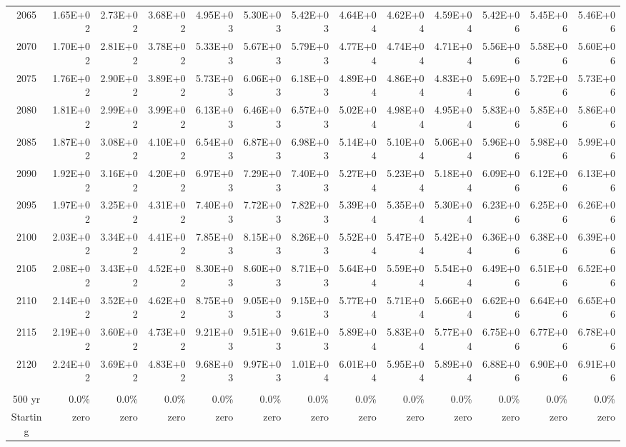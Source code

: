 \documentclass{article}
\begin{document}
\begin{table}
\begin{tabular}{crrr|rrr|rrr|rrr}
2065     & 1.65E+02 & 2.73E+02 & 3.68E+02 & 4.95E+03 & 5.30E+03 & 5.42E+03 & 4.64E+04 & 4.62E+04 & 4.59E+04 & 5.42E+06 & 5.45E+06 & 5.46E+06 \\
2070     & 1.70E+02 & 2.81E+02 & 3.78E+02 & 5.33E+03 & 5.67E+03 & 5.79E+03 & 4.77E+04 & 4.74E+04 & 4.71E+04 & 5.56E+06 & 5.58E+06 & 5.60E+06 \\
2075     & 1.76E+02 & 2.90E+02 & 3.89E+02 & 5.73E+03 & 6.06E+03 & 6.18E+03 & 4.89E+04 & 4.86E+04 & 4.83E+04 & 5.69E+06 & 5.72E+06 & 5.73E+06 \\
2080     & 1.81E+02 & 2.99E+02 & 3.99E+02 & 6.13E+03 & 6.46E+03 & 6.57E+03 & 5.02E+04 & 4.98E+04 & 4.95E+04 & 5.83E+06 & 5.85E+06 & 5.86E+06 \\
2085     & 1.87E+02 & 3.08E+02 & 4.10E+02 & 6.54E+03 & 6.87E+03 & 6.98E+03 & 5.14E+04 & 5.10E+04 & 5.06E+04 & 5.96E+06 & 5.98E+06 & 5.99E+06 \\
2090     & 1.92E+02 & 3.16E+02 & 4.20E+02 & 6.97E+03 & 7.29E+03 & 7.40E+03 & 5.27E+04 & 5.23E+04 & 5.18E+04 & 6.09E+06 & 6.12E+06 & 6.13E+06 \\
2095     & 1.97E+02 & 3.25E+02 & 4.31E+02 & 7.40E+03 & 7.72E+03 & 7.82E+03 & 5.39E+04 & 5.35E+04 & 5.30E+04 & 6.23E+06 & 6.25E+06 & 6.26E+06 \\
2100     & 2.03E+02 & 3.34E+02 & 4.41E+02 & 7.85E+03 & 8.15E+03 & 8.26E+03 & 5.52E+04 & 5.47E+04 & 5.42E+04 & 6.36E+06 & 6.38E+06 & 6.39E+06 \\
2105     & 2.08E+02 & 3.43E+02 & 4.52E+02 & 8.30E+03 & 8.60E+03 & 8.71E+03 & 5.64E+04 & 5.59E+04 & 5.54E+04 & 6.49E+06 & 6.51E+06 & 6.52E+06 \\
2110     & 2.14E+02 & 3.52E+02 & 4.62E+02 & 8.75E+03 & 9.05E+03 & 9.15E+03 & 5.77E+04 & 5.71E+04 & 5.66E+04 & 6.62E+06 & 6.64E+06 & 6.65E+06 \\
2115     & 2.19E+02 & 3.60E+02 & 4.73E+02 & 9.21E+03 & 9.51E+03 & 9.61E+03 & 5.89E+04 & 5.83E+04 & 5.77E+04 & 6.75E+06 & 6.77E+06 & 6.78E+06 \\
2120     & 2.24E+02 & 3.69E+02 & 4.83E+02 & 9.68E+03 & 9.97E+03 & 1.01E+04 & 6.01E+04 & 5.95E+04 & 5.89E+04 & 6.88E+06 & 6.90E+06 & 6.91E+06 \\
         &          &          &          &          &          &          &          &          &          &          &          &          \\ \hline
500 yr   & 0.0\%    & 0.0\%    & 0.0\%    & 0.0\%    & 0.0\%    & 0.0\%    & 0.0\%    & 0.0\%    & 0.0\%    & 0.0\%    & 0.0\%    & 0.0\%    \\
Starting & zero     & zero     & zero     & zero     & zero     & zero     & zero     & zero     & zero     & zero     & zero     & zero     \\

\end{tabular}
\end{table}
\end{document}
